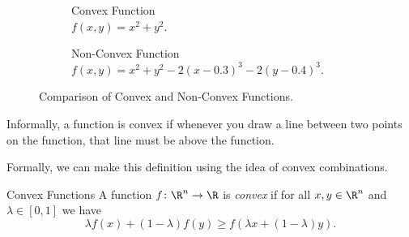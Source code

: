 \begin{figure}[H]
    \centering
    \begin{subfigure}[b]{0.45\textwidth}
        \centering
        \caption{Convex Function\\ $f(x,y) = x^2 + y^2$.}
    \end{subfigure} 
    \hfill
    \begin{subfigure}[b]{0.45\textwidth}
        \centering
        \caption{Non-Convex Function\\ $f(x,y) = x^2 + y^2 - 2(x - 0.3)^3 - 2(y - 0.4)^3$.}
    \end{subfigure}
    \caption{Comparison of Convex and Non-Convex Functions.}
\end{figure} 


Informally, a function is convex if whenever you draw a line between two points on the function, that line must be above the function. 


\begin{figure}[H]
\end{figure}

Formally, we can make this definition using the idea of convex combinations.



\begin{definition}{Convex Functions}{}
A function $f \colon \R^n \to \R$ is \emph{convex} if for all $x,y \in \R^n$ and $\lambda \in [0,1]$ we have 
\begin{equation}
\lambda f(x) + (1-\lambda)f(y) \geq f(\lambda x + (1-\lambda) y).
\end{equation}
\end{definition}




